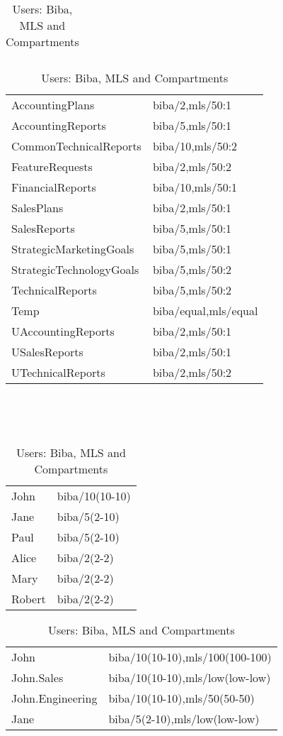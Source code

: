 \documentclass[10pt,a4paper,conference,onecolumn]{IEEEtran}
\begin{document}
\begin{table}[ht]
\begin{tabular}{|l|l|}
\hline
\end{tabular}
\hfill
\begin{tabular}{|l|l|}\hline
AccountingPlans & biba/2,mls/50:1\\
AccountingReports & biba/5,mls/50:1\\
CommonTechnicalReports & biba/10,mls/50:2\\
FeatureRequests & biba/2,mls/50:2\\
FinancialReports & biba/10,mls/50:1\\
SalesPlans & biba/2,mls/50:1\\
SalesReports & biba/5,mls/50:1\\
StrategicMarketingGoals & biba/5,mls/50:1\\
StrategicTechnologyGoals & biba/5,mls/50:2\\
TechnicalReports & biba/5,mls/50:2\\
Temp & biba/equal,mls/equal\\
UAccountingReports & biba/2,mls/50:1\\
USalesReports & biba/2,mls/50:1\\
UTechnicalReports & biba/2,mls/50:2\\
\hline
\end{tabular}
\vspace{7mm}\\
\parbox[t]{0.19\textwidth}{\caption{Users: Biba}\label{tab:UserLabelsForBibaModel}}
\hfill
\parbox[t]{0.30\textwidth}{\caption{Users: Biba and MLS}\label{tab:UserLabelsForMLSModel}}
\hfill
\parbox[t]{0.35\textwidth}{\caption{Users: Biba, MLS and Compartments}\label{tab:UserLabelsForCompartments}}\\
\begin{tabular}{|l|l|}\hline
John & biba/10(10-10)\\
Jane & biba/5(2-10)\\
Paul & biba/5(2-10)\\
Alice & biba/2(2-2)\\
Mary & biba/2(2-2)\\
Robert & biba/2(2-2)\\
\hline
\end{tabular}
\hfill
\begin{tabular}{|l|l|}\hline
John & biba/10(10-10),mls/100(100-100)\\
John.Sales & biba/10(10-10),mls/low(low-low)\\
John.Engineering & biba/10(10-10),mls/50(50-50)\\
Jane & biba/5(2-10),mls/low(low-low)\\

\end{tabular}
\end{table}
\end{document}
